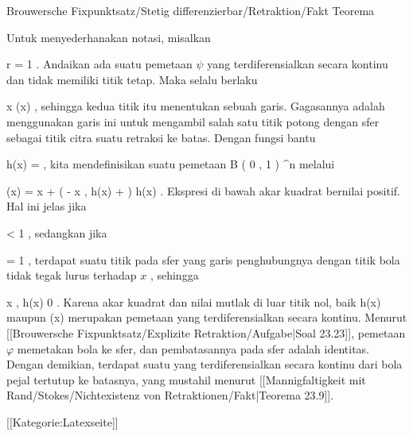 {Brouwersche Fixpunktsatz/Stetig differenzierbar/Retraktion/Fakt}
{Teorema}
{}
{

\faktzusatz {}
\faktzusatz {}

}
{

Untuk menyederhanakan notasi, misalkan

\mavergleichskette
{\vergleichskette
{ r
}
{ = }{ 1
}
{  }{
}
{    }{
}
{   }{
}
}
{}{}{.}
Andaikan ada suatu pemetaan $\psi$ yang terdiferensialkan secara kontinu dan tidak memiliki titik tetap. Maka selalu berlaku

\mavergleichskettedisp
{\vergleichskette
{ x
}
{ \neq} { \psi(x)
}
{ } {
}
{ } {
}
{ } {
}
}
{}{}{,}
sehingga kedua titik itu menentukan sebuah garis. Gagasannya adalah menggunakan garis ini untuk mengambil salah satu
 {} {}
titik potong dengan sfer sebagai titik citra suatu retraksi ke batas. Dengan fungsi bantu

\mavergleichskettedisp
{\vergleichskette
{ h(x)
}
{ =} { {  }
}
{ } {
}
{ } {
}
{ } {
}
}
{}{}{,}
kita mendefinisikan suatu pemetaan
\maabbdisp {\varphi} { B  \left(  0 , 1 \right) } { \R^n
} {}
melalui

\mavergleichskettedisphandlinks
{\vergleichskettedisphandlinks
{ \varphi(x)
}
{ =} { x + \left(  - \left\langle  x  , h(x)  \right\rangle +   \right) \cdot h(x)
}
{ } {
}
{ } {
}
{ } {
}
}
{}{}{.}
Ekspresi di bawah akar kuadrat bernilai positif. Hal ini jelas jika

\mavergleichskette
{\vergleichskette
{  \Vert
}
{ < }{ 1
}
{  }{
}
{    }{
}
{   }{
}
}
{}{}{,}
sedangkan jika

\mavergleichskette
{\vergleichskette
{  \Vert
}
{ = }{ 1
}
{  }{
}
{    }{
}
{   }{
}
}
{}{}{,}
terdapat suatu titik pada sfer yang garis penghubungnya dengan titik bola
 tidak tegak lurus terhadap $x$
 {} {,}
sehingga

\mavergleichskettedisp
{\vergleichskette
{ \left\langle  x  , h(x)  \right\rangle
}
{ \neq} { 0
}
{ } {
}
{ } {
}
{ } {
}
}
{}{}{.}
Karena akar kuadrat dan nilai mutlak
di luar titik nol, baik
\mathkor {} {h(x)} {maupun} {\varphi(x)} {}
merupakan pemetaan yang terdiferensialkan secara kontinu. Menurut
[[Brouwersche Fixpunktsatz/Explizite Retraktion/Aufgabe|Soal 23.23]],
pemetaan $\varphi$ memetakan bola ke sfer, dan pembatasannya pada sfer adalah identitas. Dengan demikian, terdapat suatu
yang terdiferensialkan secara kontinu dari bola pejal tertutup ke batasnya, yang mustahil menurut
[[Mannigfaltigkeit mit Rand/Stokes/Nichtexistenz von Retraktionen/Fakt|Teorema 23.9]].

}

 [[Kategorie:Latexseite]]
